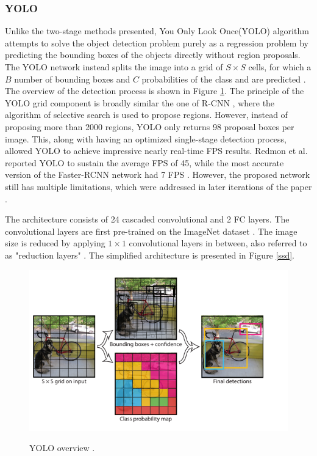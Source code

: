 \subsubsection{YOLO}
\label{yolo_section} 

Unlike the two-stage methods presented, You Only Look Once(YOLO) \cite{Redmon2015a} algorithm attempts to solve the object detection problem purely as a regression problem by predicting the bounding boxes of the objects directly without region proposals. The YOLO network instead splits the image into a grid of $S\times S$ cells, for which a $B$ number of bounding boxes and $C$ probabilities of the class and  are predicted \cite{Redmon2015a}. The overview of the detection process is shown in Figure \ref{yolo}. The principle of the YOLO grid component is broadly similar the one of R-CNN \cite{Girshick2013}, where the algorithm of selective search \cite{Uijlings13} is used to propose regions. However, instead of proposing more than 2000 regions, YOLO only returns 98 proposal boxes per image. This, along with having an optimized single-stage detection process, allowed YOLO to achieve impressive nearly real-time FPS results. Redmon et al. reported YOLO to sustain the average FPS of 45, while the most accurate version of the Faster-RCNN network had 7 FPS \cite{Redmon2015a}. However, the proposed network still has multiple limitations, which were addressed in later iterations of the paper  \cite{Redmon2016, Redmon2018a}.

The architecture consists of 24 cascaded convolutional and 2 FC layers. The convolutional layers are first pre-trained on the ImageNet dataset \cite{Russakovsky2014}. The image size is reduced by applying $1\times1$ convolutional layers in between, also referred to as "reduction layers"  \cite{Redmon2015a}. The simplified architecture is presented in Figure \ref{ssd}.

\begin{figure}[htb]
	\begin{center}
		\includegraphics[width=12cm]{./yolo.png}
	\end{center}
	\caption{YOLO overview \cite{Redmon2015a}.}
	\begin{center}
		\label{yolo}
	\end{center}
\end{figure}
\FloatBarrier


